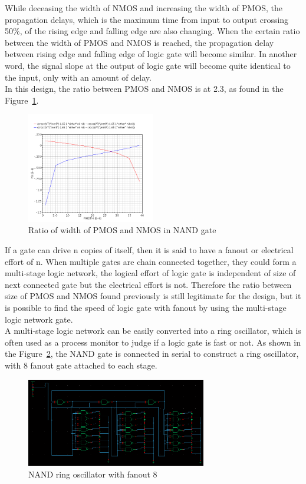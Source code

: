 While deceasing the width of NMOS and increasing the width of PMOS, the propagation delays, which is the maximum time from input to output crossing 50\%, of the rising edge and falling edge are also changing. When the certain ratio between the width of PMOS and NMOS is reached, the propagation delay between rising edge and falling edge of logic gate will become similar. In another word, the signal slope at the output of logic gate will become quite identical to the input, only with an amount of delay.\\
In this design, the ratio between PMOS and NMOS is  at 2.3, as found in the Figure~\ref{fig:NANDratio}.
\begin{figure}[hf]
		\centering
		\includegraphics[width = 0.5\textwidth]{Figures/NANDratio}		
		\caption{Ratio of width of PMOS and NMOS in NAND gate}
		\label {fig:NANDratio}
\end{figure}

If a gate can drive n copies of itself, then it is said to have a fanout or electrical effort of n. When multiple gates are chain connected together, they could form a multi-stage logic network, the logical effort of logic gate is independent of size of next connected gate but the electrical effort is not. Therefore the ratio between size of PMOS and NMOS found previously is still legitimate for the design, but it is possible to find the speed of logic gate with fanout by using the multi-stage logic network gate.\\
A multi-stage logic network can be easily converted into a ring oscillator, which is often used as a process monitor to judge if a logic gate is fast or not. As shown in the Figure~\ref{fig:nandro}, the NAND gate is connected in serial to construct a ring oscillator, with 8 fanout gate attached to each stage.
\begin{figure}[hf]
		\centering
		\includegraphics[width = 0.7\textwidth]{Figures/nandro}		
		\caption{NAND ring oscillator with fanout 8}
		\label {fig:nandro}
\end{figure}

